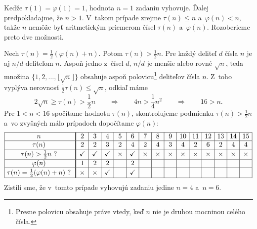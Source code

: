 {%
Keďže $\tau(1)=\varphi(1)=1$, hodnota $n=1$ zadaniu vyhovuje. Ďalej predpokladajme, že $n>1$. V~takom prípade zrejme $\tau(n)\le n$ a~$\varphi(n)<n$, takže $n$ nemôže byť aritmetickým priemerom čísel $\tau(n)$ a~$\varphi(n)$. Rozoberieme preto dve možnosti.

Nech $\tau(n)=\frac12(\varphi(n)+n)$. Potom $\tau(n)>\frac12n$. Pre každý deliteľ $d$ čísla $n$ je aj $n/d$ deliteľom $n$. Aspoň jedno z~čísel $d$, $n/d$ je menšie alebo rovné $\sqrt n$, teda množina $\{1,2,\dots,\lfloor\sqrt{n}\rfloor\}$ obsahuje aspoň polovicu\footnote{Presne polovicu obsahuje práve vtedy, keď $n$ nie je druhou mocninou celého čísla.} deliteľov čísla $n$. Z~toho vyplýva nerovnosť $\frac12\tau(n)\le\sqrt n$, odkiaľ máme
$$
2\sqrt n\ge\tau(n)>\frac12n\qquad\Rightarrow\qquad 4n>\frac14n^2 \qquad\Rightarrow\qquad 16>n.
$$
Pre $1<n<16$ spočítame hodnotu $\tau(n)$, skontrolujeme podmienku $\tau(n)>\frac12n$ a~vo zvyšných málo prípadoch dopočítame $\varphi(n)$:
$$
\vbox{\offinterlineskip
       \halign{\strut\vrule\ \hfil # \hfil\vrule width1.2pt&&\hbox to 1.8em{\hss$#$\hss}\vrule\cr
\noalign{\hrule}
$n$                 & 2 & 3 &  4 &  5 &  6 &   7 &   8 & 9 & 10 & 11 & 12 & 13 & 14 & 15\cr
\noalign{\hrule}
$\tau(n)$           & 2 & 2 &  3 &  2 &  4 &   2 &   4 & 3 & 4 & 2 & 6 & 2 & 4 & 4\cr
\noalign{\hrule}
$\tau(n)>\frac12n$~?\vphantom{\vrule height3.5mm depth 1.6mm}  & \checkmark & \checkmark & \checkmark & \times & \checkmark & \times & \times & \times & \times & \times & \times & \times & \times & \times\cr
\noalign{\hrule}
$\varphi(n)$           & 1 & 2 & 2 &  & 2 &  &  &  &  &  &  &  &  & \cr
\noalign{\hrule}
$\tau(n)=\frac12(\varphi(n)+n)$~?\vphantom{\vrule height3.5mm depth 1.6mm}           & \times & \times & \checkmark &  & \checkmark &  &  &  &  &  &  &  &  & \cr
\noalign{\hrule}
}}
$$
Zistili sme, že v~tomto prípade vyhovujú zadaniu jedine $n=4$ a~$n=6$.

}
